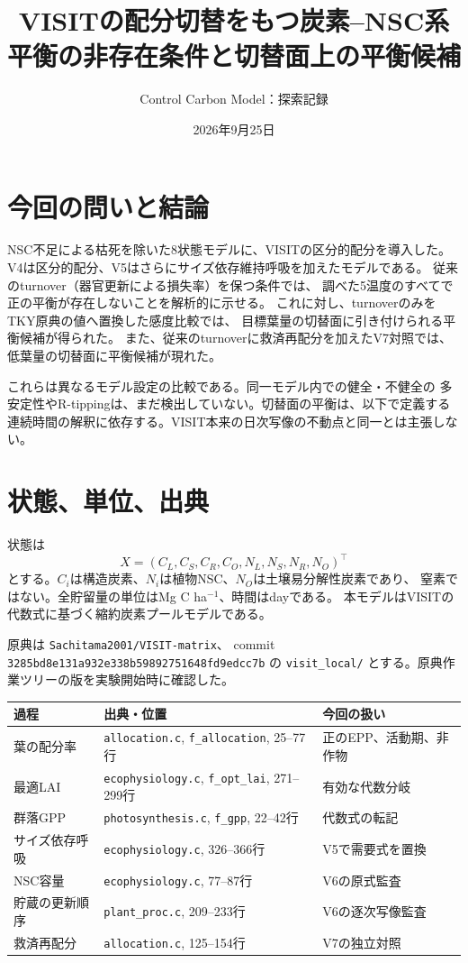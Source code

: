 \documentclass[a4paper,11pt]{ltjsarticle}
\title{VISITの配分切替をもつ炭素--NSC系\\
平衡の非存在条件と切替面上の平衡候補}
\author{Control Carbon Model：探索記録}
\date{2026年9月25日}
\begin{document}
\maketitle

\section{今回の問いと結論}
NSC不足による枯死を除いた8状態モデルに、VISITの区分的配分を導入した。
V4は区分的配分、V5はさらにサイズ依存維持呼吸を加えたモデルである。
従来のturnover（器官更新による損失率）を保つ条件では、
調べた5温度のすべてで正の平衡が存在しないことを解析的に示せる。
これに対し、turnoverのみをTKY原典の値へ置換した感度比較では、
目標葉量の切替面に引き付けられる平衡候補が得られた。
また、従来のturnoverに救済再配分を加えたV7対照では、
低葉量の切替面に平衡候補が現れた。

これらは異なるモデル設定の比較である。同一モデル内での健全・不健全の
多安定性やR-tippingは、まだ検出していない。切替面の平衡は、以下で定義する
連続時間の解釈に依存する。VISIT本来の日次写像の不動点と同一とは主張しない。

\section{状態、単位、出典}
状態は
\[
 X=(C_L,C_S,C_R,C_O,N_L,N_S,N_R,N_O)^\top
\]
とする。$C_i$は構造炭素、$N_i$は植物NSC、$N_O$は土壌易分解性炭素であり、
窒素ではない。全貯留量の単位はMg C ha$^{-1}$、時間はdayである。
本モデルはVISITの代数式に基づく縮約炭素プールモデルである。

原典は \texttt{Sachitama2001/VISIT-matrix}、
commit \texttt{3285bd8e131a932e338b59892751648fd9edcc7b} の
\texttt{visit\_local/} とする。原典作業ツリーの版を実験開始時に確認した。
\begin{longtable}{p{33mm}p{79mm}p{28mm}}
\toprule
過程&出典・位置&今回の扱い\\\midrule
葉の配分率&\texttt{allocation.c}, \texttt{f\_allocation}, 25--77行&正のEPP、活動期、非作物\\
最適LAI&\texttt{ecophysiology.c}, \texttt{f\_opt\_lai}, 271--299行&有効な代数分岐\\
群落GPP&\texttt{photosynthesis.c}, \texttt{f\_gpp}, 22--42行&代数式の転記\\
サイズ依存呼吸&\texttt{ecophysiology.c}, 326--366行&V5で需要式を置換\\
NSC容量&\texttt{ecophysiology.c}, 77--87行&V6の原式監査\\
貯蔵の更新順序&\texttt{plant\_proc.c}, 209--233行&V6の逐次写像監査\\
救済再配分&\texttt{allocation.c}, 125--154行&V7の独立対照\\\bottomrule
\end{longtable}
\end{document}
